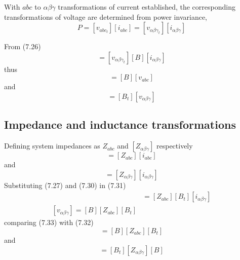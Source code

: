 \documentclass[a4paper,numbers=noenddot,12pt]{scrbook}
\begin{document}
        With $abc$ to $\alpha \beta \gamma$ transformations of current established, the corresponding transformations of voltage are determined from power invariance,
        \begin{equation}
            P = [v_{abc_{t}}][i_{abc}] = [v_{\alpha \beta \gamma_{t}}][i_{\alpha \beta \gamma}]
            \label{eq:Eq7.28}
        \end{equation}

        From (7.26)
        \begin{equation*}
            [v_{abc_{t}}][i_{abc}] = [v_{\alpha \beta \gamma_{t}}][B][i_{\alpha \beta \gamma}]
            \label{}
        \end{equation*}
        thus
        \begin{equation}
            [v_{\alpha \beta \gamma}] = [B] [v_{abc}]
            \label{eq:Eq7.29}
        \end{equation}
        and
        \begin{equation}
            [v_{abc}] = [B_t] [v_{\alpha \beta \gamma}]
            \label{eq:Eq7.30}
        \end{equation}

        \subsection{Impedance and inductance transformations}
        Defining system impedances as $Z_{abc}$ and $[Z_{\alpha \beta \gamma}]$ respectively
        \begin{equation}
            [v_{abc}] = [Z_{abc}] [i_{abc}]
            \label{eq:Eq7.31}
        \end{equation}
        and
        \begin{equation}
            [v_{\alpha \beta \gamma}] = [Z_{\alpha \beta \gamma}] [i_{\alpha \beta \gamma}]
            \label{eq:Eq7.32}
        \end{equation}
        Substituting (7.27) and (7.30) in (7.31)
        \begin{align}
            [B_t][v_{\alpha \beta \gamma}] & =[Z_{abc}] [B_t] [i_{\alpha \beta \gamma}] \nonumber \\
            [v_{\alpha \beta \gamma}] = [B][Z_{abc}][B_t]
            \label{eq:Eq7.33}
        \end{align}
        comparing (7.33) with (7.32)
        \begin{equation}
            [Z_{\alpha \beta \gamma}] = [B][Z_{abc}] [B_t]
            \label{eq:7.34}
        \end{equation}
        and
        \begin{equation}
            [Z_{abc}] = [B_t] [Z_{\alpha \beta \gamma}][B]
            \label{eq:Eq7.35}
        \end{equation}
\end{document}
